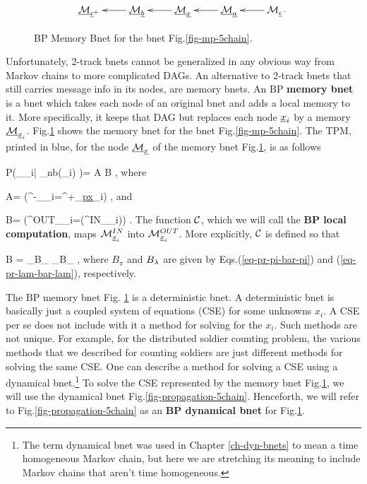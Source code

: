 \begin{figure}[h!]
$$\xymatrix{
\ucalm_{\rveps^+}
&
\ucalm_\rvb\ar[l]
&
\ucalm_\rvx\ar[l]
&
\ucalm_\rva\ar[l]
&
\calm_{\rveps^-}\ar[l]
}$$
\caption{BP Memory Bnet for the bnet
Fig.\ref{fig-mp-5chain}. }
\label{fig-mem-5chain}
\end{figure}

Unfortunately,
2-track bnets cannot be
 generalized in any
obvious way  from 
Markov chains to more
complicated DAGs.
An alternative to 2-track bnets
that still
carries message
info in its nodes,
are memory bnets. An BP
{\bf memory bnet}
is a bnet 
which takes each node
of an original
bnet and
adds a local memory to it.
More specifically,
it keeps that DAG
but replaces each node
$\rvx_i$
by a memory $\ucalm_{\rvx_i}$.
Fig.\ref{fig-mem-5chain} shows 
the memory bnet for
the bnet Fig.\ref{fig-mp-5chain}.
The TPM, printed in blue,
for the  node $\ucalm_\rvx$
of the memory bnet 
Fig.\ref{fig-mem-5chain}, is as follows

\beq\color{blue}
P(\calm_{\rvx_i}|
\calm_{\rvn\in nb(\rvx_i)}
)= A B
\;,
\eeq
where

\beq
A=
\indi(\calm^{-}_{\rvx_i}=\calm^{+}_{\ul{px}_i})
\;,
\eeq
and

\beq
B=
\indi(\calm^{OUT}_{\rvx_i}=\calc(\calm^{IN}_{\rvx_i}))
\label{eq-mp-update-static}
\;.
\eeq
The function ${\cal C}$,
which 
we will call the {\bf BP local computation},
maps $\calm^{IN}_{\rvx_i}$
into $\calm^{OUT}_{\rvx_i}$. More explicitly,
${\cal C}$ is defined so that

\beq
B
=
_{B_\pi}
_{B_\lam}
\;,
\eeq
where
$B_\pi$ and $B_\lambda$
are given by Eqs.(\ref{eq-pr-pi-bar-pi})
and (\ref{eq-pr-lam-bar-lam}),
respectively.



The BP memory bnet
 Fig.
\ref{fig-mem-5chain}
is a deterministic bnet.
A deterministic bnet
is basically
just a coupled system
of equations (CSE)
for some unknowns $x_i$. 
A CSE per se does not
include with it a method for  
solving for the $x_i$. Such methods are not
unique.
For example,
for the 
distributed
soldier counting 
problem,
the various 
methods that
we described
for counting soldiers
are just different
methods 
for solving the same
CSE.
One can describe 
a method for solving a
CSE using a dynamical bnet.\footnote{
The term
dynamical bnet
was used in Chapter \ref{ch-dyn-bnets}
to mean a time homogeneous
Markov chain, but 
here we are stretching its meaning to
include
Markov chains
that aren't 
time homogeneous.}
To solve
the CSE
represented by
the memory bnet Fig.\ref{fig-mem-5chain},
we will use the 
dynamical bnet
Fig.\ref{fig-propagation-5chain}.
Henceforth, 
we will refer to
Fig.\ref{fig-propagation-5chain} as
an {\bf BP dynamical bnet}
for Fig.\ref{fig-mem-5chain}.

